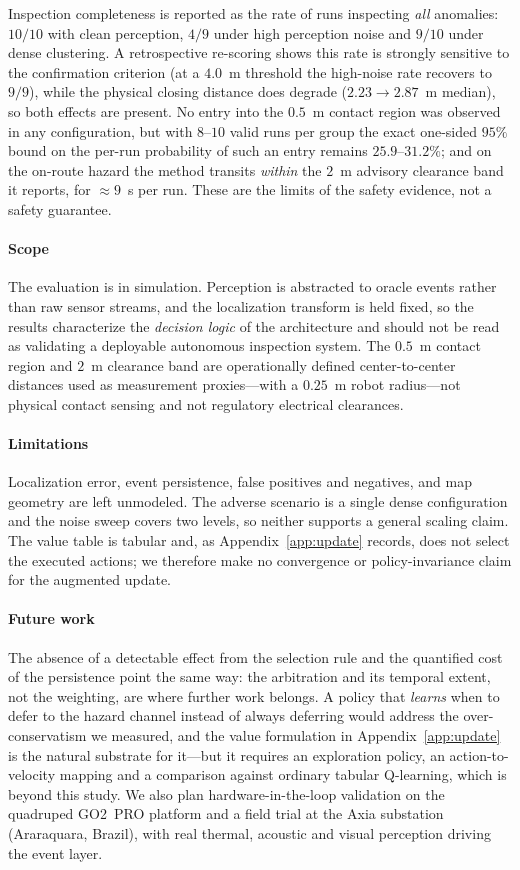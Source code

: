 Inspection completeness is reported as the rate of runs inspecting \emph{all}
anomalies: $10/10$ with clean perception, $4/9$ under high perception noise and
$9/10$ under dense clustering. A retrospective re-scoring shows this rate is strongly
sensitive to the confirmation criterion (at a $4.0$~m threshold the high-noise rate
recovers to $9/9$), while the physical closing distance does degrade
($2.23 \rightarrow 2.87$~m median), so both effects are present. No entry into the
$0.5$~m contact region was observed in any configuration, but with $8$--$10$ valid
runs per group the exact one-sided $95\%$ bound on the per-run probability of such an
entry remains $25.9$--$31.2\%$; and on the on-route hazard the method transits
\emph{within} the $2$~m advisory clearance band it reports, for ${\approx}9$~s per
run. These are the limits of the safety evidence, not a safety guarantee.

\paragraph*{Scope} The evaluation is in simulation. Perception is abstracted to
oracle events rather than raw sensor streams, and the localization transform is held
fixed, so the results characterize the \emph{decision logic} of the architecture and
should not be read as validating a deployable autonomous inspection system. The
$0.5$~m contact region and $2$~m clearance band are operationally defined
center-to-center distances used as measurement proxies---with a $0.25$~m robot
radius---not physical contact sensing and not regulatory electrical clearances.

\paragraph*{Limitations} Localization error, event persistence, false positives and
negatives, and map geometry are left unmodeled. The adverse scenario is a single
dense configuration and the noise sweep covers two levels, so neither supports a
general scaling claim. The value table is tabular and, as Appendix~\ref{app:update}
records, does not select the executed actions; we therefore make no convergence or
policy-invariance claim for the augmented update.

\paragraph*{Future work} The absence of a detectable effect from the selection rule
and the quantified cost of the persistence point the same way: the arbitration and its
temporal extent, not the weighting, are where further work belongs. A policy that \emph{learns} when to defer to the hazard channel
instead of always deferring would address the over-conservatism we measured, and the
value formulation in Appendix~\ref{app:update} is the natural substrate for it---but
it requires an exploration policy, an action-to-velocity mapping and a comparison
against ordinary tabular Q-learning, which is beyond this study. We also plan
hardware-in-the-loop validation on the quadruped GO2~PRO platform and a field trial
at the Axia substation (Araraquara, Brazil), with real thermal, acoustic and visual
perception driving the event layer.
